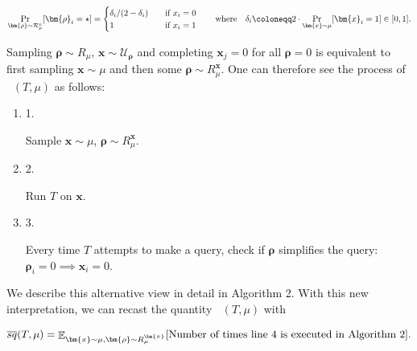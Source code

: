 \documentclass[10pt,a4paper]{article}
\begin{document}
\[\begin{gathered}
\Pr_{\bm{\rho}\sim\mathcal{R}_{\mu}^{x}}[\bm{\rho}_{i}=\star]=\begin{cases}\delta_{i}/(2-\delta_{i})&\quad\textup{if $x_{i}=0$}\\
1&\quad\textup{if $x_{i}=1$}\end{cases}\quad\quad\text{where}\quad\delta_{i}\coloneqq 2\cdot\Pr_{\bm{x}\sim\mu}[\bm{x}_{i}=1]\in[0,1].
\end{gathered}\]


Sampling $\bm{\rho}\sim R_{\mu}$, $\bm{x}\sim\mathcal{U}_{\bm{\rho}}$ and completing $\bm{x}_{j}=0$ for all $\bm{\rho}=0$ is equivalent to first sampling $\bm{x}\sim\mu$ and then some $\bm{\rho}\sim R_{\mu}^{\bm{x}}$. One can therefore see the process of $\mathop{\overline{sq}}(T,\mu)$ as follows:\par


\begin{enumerate}


\item[] 
1. 


Sample $\bm{x}\sim\mu$, $\bm{\rho}\sim R_{\mu}^{\bm{x}}$.\par





\item[] 
2. 


Run $T$ on $\bm{x}$.\par





\item[] 
3. 


Every time $T$ attempts to make a query, check if $\bm{\rho}$ simplifies the query: $\bm{\rho}_{i}=0\implies\bm{x}_{i}=0$.\par





\end{enumerate}


We describe this alternative view in detail in Algorithm 2. With this new interpretation, we can recast the quantity $\mathop{\overline{sq}}(T,\mu)$ with\par


\[\begin{gathered}
\mathop{\overline{sq}}(T,\mu)=\mathop{\mathbb{E}}\nolimits_{\bm{x}\sim\mu,\bm{\rho}\sim R_{\mu}^{\bm{x}}}[\text{Number of times
line\nobreak\ 4 is executed in Algorithm 2}].
\end{gathered}\]
\end{document}

